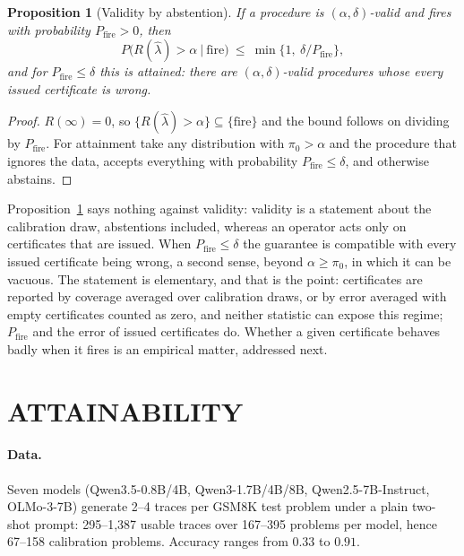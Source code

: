 \documentclass[twoside]{article}
\newtheorem{proposition}{Proposition}
\theoremstyle{remark}
\newcommand{\Rsel}{R}
\newcommand{\lamhat}{\hat\lambda}
\newcommand{\pizero}{\pi_0}
\newcommand{\pfire}{P_{\mathrm{fire}}}
\begin{document}
\begin{proposition}[Validity by abstention]
\label{prop:abstain}
If a procedure is $(\alpha,\delta)$-valid and fires with probability $\pfire>0$, then
\[
P\big(\Rsel(\lamhat)>\alpha\ \big|\ \text{fire}\big)\ \le\ \min\{1,\ \delta/\pfire\},
\]
and for $\pfire\le\delta$ this is attained: there are $(\alpha,\delta)$-valid procedures whose every issued certificate is wrong.
\end{proposition}

\begin{proof}
$\Rsel(\infty)=0$, so $\{\Rsel(\lamhat)>\alpha\}\subseteq\{\text{fire}\}$ and the bound follows on dividing by $\pfire$. For attainment take any distribution with $\pizero>\alpha$ and the procedure that ignores the data, accepts everything with probability $\pfire\le\delta$, and otherwise abstains.
\end{proof}

Proposition~\ref{prop:abstain} says nothing against validity: validity is a statement about the calibration draw, abstentions included, whereas an operator acts only on certificates that are issued. When $\pfire\le\delta$ the guarantee is compatible with every issued certificate being wrong, a second sense, beyond $\alpha\ge\pizero$, in which it can be vacuous. The statement is elementary, and that is the point: certificates are reported by coverage averaged over calibration draws, or by error averaged with empty certificates counted as zero, and neither statistic can expose this regime; $\pfire$ and the error of issued certificates do. Whether a given certificate behaves badly when it fires is an empirical matter, addressed next.

\section{ATTAINABILITY}
\label{sec:attain}

\paragraph{Data.} Seven models (Qwen3.5-0.8B/4B, Qwen3-1.7B/4B/8B, Qwen2.5-7B-Instruct, OLMo-3-7B) generate 2--4 traces per GSM8K test problem \citep{cobbe2021gsm8k} under a plain two-shot prompt: 295--1{,}387 usable traces over 167--395 problems per model, hence 67--158 calibration problems. Accuracy ranges from $0.33$ to $0.91$.


\end{document}
